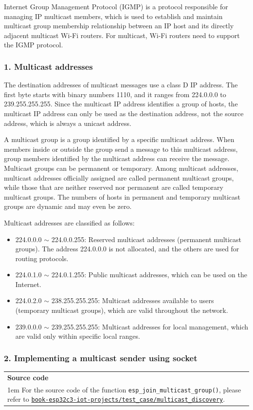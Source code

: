 \documentclass[a4paper,12pt,openany]{book}
\newcommand{\note}[2][NOTE]{ %
\vspace{6pt}
\begin{tabular}{b{\textwidth}}
\hline
\fontfamily{phv}\selectfont \textbf{#1}\\
\leftskip 1em #2\\
\hline
\end{tabular}
}
\begin{document}
Internet Group Management Protocol (IGMP) is a protocol responsible for managing IP multicast members, which is used to establish and maintain multicast group membership relationship between an IP host and its directly adjacent multicast Wi-Fi routers. For multicast, Wi-Fi routers need to support the IGMP protocol.

\subsubsection{1. Multicast addresses}
The destination addresses of multicast messages use a class D IP address. The first byte starts with binary numbers 1110, and it ranges from 224.0.0.0 to 239.255.255.255. Since the multicast IP address identifies a group of hosts, the multicast IP address can only be used as the destination address, not the source address, which is always a unicast address.

A multicast group is a group identified by a specific multicast address. When members inside or outside the group send a message to this multicast address, group members identified by the multicast address can receive the message. Multicast groups can be permanent or temporary. Among multicast addresses, multicast addresses officially assigned are called permanent multicast groups, while those that are neither reserved nor permanent are called temporary multicast groups. The numbers of hosts in permanent and temporary multicast groups are dynamic and may even be zero.

Multicast addresses are classified as follows:

\begin{itemize}[leftmargin=1.5em,noitemsep]
    \item 224.0.0.0 $\sim$ 224.0.0.255: Reserved multicast addresses (permanent multicast groups). The address 224.0.0.0 is not allocated, and the others are used for routing protocols.
    \item 224.0.1.0 $\sim$ 224.0.1.255: Public multicast addresses, which can be used on the Internet.
    \item 224.0.2.0 $\sim$ 238.255.255.255: Multicast addresses available to users (temporary multicast groups), which are valid throughout the network.
    \item 239.0.0.0 $\sim$ 239.255.255.255: Multicast addresses for local management, which are valid only within specific local ranges.
\end{itemize}

\subsubsection{2. Implementing a multicast sender using socket}
\note[Source code]{For the source code of the function \texttt{esp\_join\_multicast\_group()}, please refer to \href{https://github.com/espressif/book-esp32c3-iot-projects/tree/main/test_case/multicast_discovery}{\texttt{book-esp32c3-iot-projects/test\_case/multicast\_discovery}}.}
\end{document}
